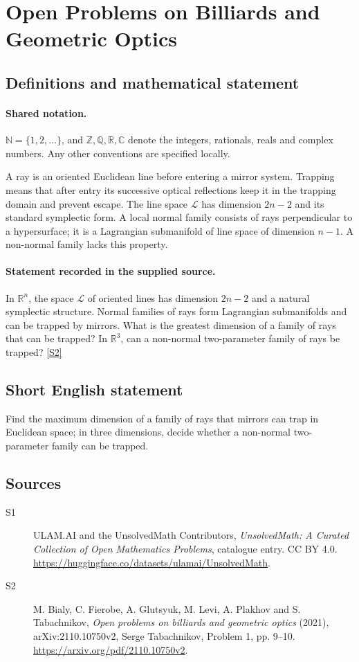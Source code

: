 \documentclass[11pt]{article}
\newcommand{\sref}[2]{\hyperlink{source:#1:#2}{[S#2]}}
\begin{document}
\section{Open Problems on Billiards and Geometric Optics}\label{statement}

\subsection{Definitions and mathematical statement}

\paragraph{Shared notation.}$\mathbb N=\{1,2,\ldots\}$, and $\mathbb Z,\mathbb Q,\mathbb R,\mathbb C$ denote the integers, rationals, reals and complex numbers. Any other conventions are specified locally.


A ray is an oriented Euclidean line before entering a mirror system. Trapping means that after entry its successive optical reflections keep it in the trapping domain and prevent escape. The line space $\mathcal L$ has dimension $2n-2$ and its standard symplectic form. A local normal family consists of rays perpendicular to a hypersurface; it is a Lagrangian submanifold of line space of dimension $n-1$. A non-normal family lacks this property.
\paragraph{Statement recorded in the supplied source.}
In $\mathbb{R}^n$, the space $\mathcal{L}$ of oriented lines has dimension $2n-2$ and a natural symplectic structure. Normal families of rays form Lagrangian submanifolds and can be trapped by mirrors. What is the greatest dimension of a family of rays that can be trapped? In $\mathbb{R}^3$, can a non-normal two-parameter family of rays be trapped? \sref{statement}{2}
\subsection{Short English statement}
Find the maximum dimension of a family of rays that mirrors can trap in Euclidean space; in three dimensions, decide whether a non-normal two-parameter family can be trapped.
\subsection{Sources}
\begin{description}
\item[\hypertarget{source:statement:1}{S1}] ULAM.AI and the UnsolvedMath Contributors, \emph{UnsolvedMath: A Curated Collection of Open Mathematics Problems}, catalogue entry. CC BY 4.0. \url{https://huggingface.co/datasets/ulamai/UnsolvedMath}.
\item[\hypertarget{source:statement:2}{S2}] M. Bialy, C. Fierobe, A. Glutsyuk, M. Levi, A. Plakhov and S. Tabachnikov, \emph{Open problems on billiards and geometric optics} (2021), arXiv:2110.10750v2, Serge Tabachnikov, Problem 1, pp. 9--10. \url{https://arxiv.org/pdf/2110.10750v2}.
\end{description}
\label{end:statement}
\end{document}
